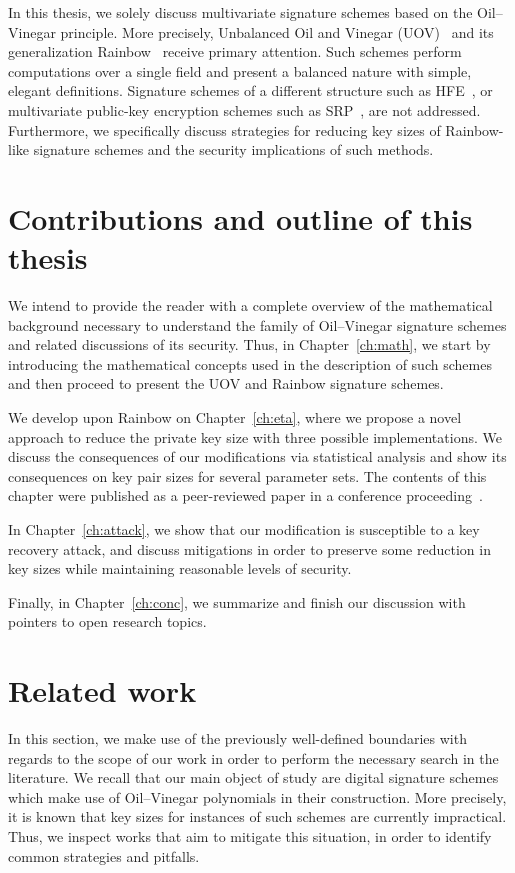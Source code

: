 \documentclass[12pt, a4paper, oneside]{memoir}
\theoremstyle{definition}
\begin{document}
In this thesis, we solely discuss multivariate signature schemes based on the Oil--Vinegar principle. More precisely, Unbalanced Oil and Vinegar (UOV)~\cite{Kipnis:199904} and its generalization Rainbow~\cite{Ding:200506} receive primary attention. Such schemes perform computations over a single field and present a balanced nature with simple, elegant definitions. Signature schemes of a different structure such as HFE~\cite{Patarin:199605}, or multivariate public-key encryption schemes such as SRP~\cite{Duong:201607}, are not addressed. Furthermore, we specifically discuss strategies for reducing key sizes of Rainbow-like signature schemes and the security implications of such methods.

\section{Contributions and outline of this thesis}

We intend to provide the reader with a complete overview of the mathematical background necessary to understand the family of Oil--Vinegar signature schemes and related discussions of its security. Thus, in Chapter~\ref{ch:math}, we start by introducing the mathematical concepts used in the description of such schemes and then proceed to present the UOV and Rainbow signature schemes. 

We develop upon Rainbow on Chapter~\ref{ch:eta}, where we propose a novel approach to reduce the private key size with three possible implementations. We discuss the consequences of our modifications via statistical analysis and show its consequences on key pair sizes for several parameter sets. The contents of this chapter were published as a peer-reviewed paper in a conference proceeding~\cite{Zambonin:201907}. 

In Chapter~\ref{ch:attack}, we show that our modification is susceptible to a key recovery attack, and discuss mitigations in order to preserve some reduction in key sizes while maintaining reasonable levels of security. 

Finally, in Chapter~\ref{ch:conc}, we summarize and finish our discussion with pointers to open research topics.

\section{Related work}\label{sec:related}

In this section, we make use of the previously well-defined boundaries with regards to the scope of our work in order to perform the necessary search in the literature. We recall that our main object of study are digital signature schemes which make use of Oil--Vinegar polynomials in their construction. More precisely, it is known that key sizes for instances of such schemes are currently impractical. Thus, we inspect works that aim to mitigate this situation, in order to identify common strategies and pitfalls.
\end{document}
